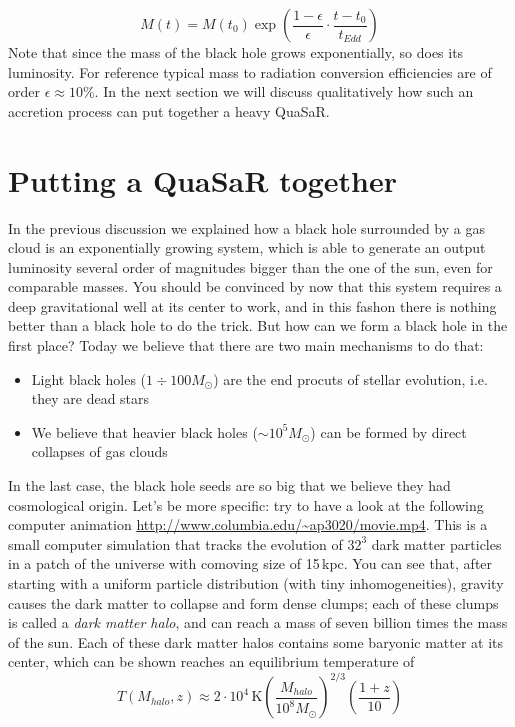 \documentclass[11pt, a4paper,oneside,openright]{book}
\numberwithin{equation}{section}
\begin{document}
\begin{equation}
M(t) = M(t_0)\exp{\left(\frac{1-\epsilon}{\epsilon}\cdot\frac{t-t_0}{t_{Edd}}\right)}
\end{equation}
Note that since the mass of the black hole grows exponentially, so does its luminosity. For reference typical mass to radiation conversion efficiencies are of order $\epsilon \approx 10\%$. In the next section we will discuss qualitatively how such an accretion process can put together a heavy QuaSaR. 

\section{Putting a QuaSaR together}
In the previous discussion we explained how a black hole surrounded by a gas cloud is an exponentially growing system, which is able to generate an output luminosity several order of magnitudes bigger than the one of the sun, even for comparable masses. You should be convinced by now that this system requires a deep gravitational well at its center to work, and in this fashon there is nothing better than a black hole to do the trick. But how can we form a black hole in the first place? Today we believe that there are two main mechanisms to do that:
\begin{itemize}
\item Light black holes ($1 \div 100 M_\odot$) are the end procuts of stellar evolution, i.e. they are dead stars
\item We believe that heavier black holes ($\sim 10^5 M_\odot$) can be formed by direct collapses of gas clouds
\end{itemize}
In the last case, the black hole seeds are so big that we believe they had cosmological origin. Let's be more specific: try to have a look at the following computer animation \url{http://www.columbia.edu/~ap3020/movie.mp4}. This is a small computer simulation that tracks the evolution of $32^3$ dark matter particles in a patch of the universe with comoving size of 15\,kpc. You can see that, after starting with a uniform particle distribution (with tiny inhomogeneities), gravity causes the dark matter to collapse and form dense clumps; each of these clumps is called a \textit{dark matter halo}, and can reach a mass of seven billion times the mass of the sun. Each of these dark matter halos contains some baryonic matter at its center, which can be shown reaches an equilibrium temperature of 
\begin{equation}
T(M_{halo},z) \approx 2\cdot 10^4\, \mathrm{K}\left(\frac{M_{halo}}{10^8 M_\odot}\right)^{2/3}\left(\frac{1+z}{10}\right)
\end{equation}
\end{document}
